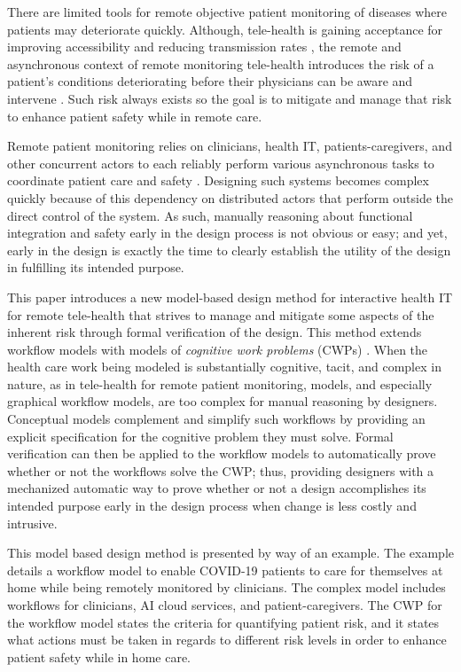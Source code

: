There are limited tools for remote objective patient monitoring of diseases where patients may deteriorate quickly. Although, tele-health is gaining acceptance for improving accessibility and reducing transmission rates \cite{10.1093/jamia/ocaa048,telehealth,10.1093/jamia/ocaa067}, the remote and asynchronous context of remote monitoring tele-health introduces the risk of a patient's conditions deteriorating before their physicians can be aware and intervene \cite{10.1097/ALN.0000000000003578}. Such risk always exists so the goal is to mitigate and manage that risk to enhance patient safety while in remote care. 

Remote patient monitoring relies on clinicians, health IT, patients-caregivers, and other concurrent actors to each reliably perform various asynchronous tasks to coordinate patient care and safety \cite{remote,Aalam229}. Designing such systems becomes complex quickly because of this dependency on distributed actors that perform outside the direct control of the system. As such, manually reasoning about functional integration and safety early in the design process is not obvious or easy; and yet, early in the design is exactly the time to clearly establish the utility of the design in fulfilling its intended purpose. 

This paper introduces a new model-based design method for interactive health IT for remote tele-health that strives to manage and mitigate some aspects of the inherent risk through formal verification of the design. This method extends workflow models with models of \emph{cognitive work problems} (CWPs) \cite{workflowmodel,workcentered,BERRY201615,chi2010}. When the health care work being modeled is substantially cognitive, tacit, and complex in nature, as in tele-health for remote patient monitoring, models, and especially graphical workflow models, are too complex for manual reasoning by designers. Conceptual models complement and simplify such workflows by providing an explicit specification for the cognitive problem they must solve. Formal verification can then be applied to the workflow models to automatically prove whether or not the workflows solve the CWP; thus, providing designers with a mechanized automatic way to prove whether or not a design accomplishes its intended purpose early in the design process when change is less costly and intrusive.

This model based design method is presented by way of an example. The example details a workflow model to enable COVID-19 patients to care for themselves at home while being remotely monitored by clinicians. The complex model includes workflows for clinicians, AI cloud services, and patient-caregivers. The CWP for the workflow model states the criteria for quantifying patient risk, and it states what actions must be taken in regards to different risk levels in order to enhance patient safety while in home care. 

